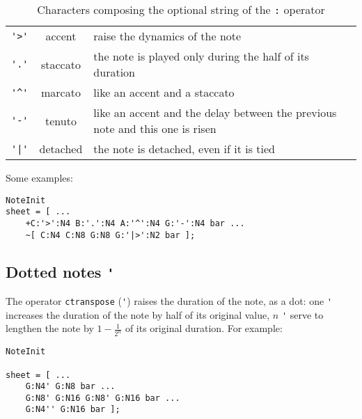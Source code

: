\documentclass{article}
\begin{document}
\begin{table}
	\center
\begin{tabular}{ccp{7cm}}
\lstinline!'>'! & accent & raise the dynamics of the note \\
\lstinline!'.'! & staccato & the note is played only during the half of its duration \\
\lstinline!'^'! & marcato & like an accent and a staccato \\
\lstinline!'-'! & tenuto & like an accent and the delay between the previous note and this one is risen \\
\lstinline!'|'! & detached & the note is detached, even if it is tied
\end{tabular}
\caption{Characters composing the optional string of the \lstinline!:! operator}
\label{table:charsOfColon}
\end{table}

Some examples: \\

\begin{lstlisting}
NoteInit
sheet = [ ...
	+C:'>':N4 B:'.':N4 A:'^':N4 G:'-':N4 bar ...
	~[ C:N4 C:N8 G:N8 G:'|>':N2 bar ];
\end{lstlisting}

\subsection{Dotted notes \lstinline!'!}

The operator \lstinline!ctranspose! (\lstinline!'!) raises the duration of the note, as a dot: one \lstinline!'! increases the duration of the note by half of its original value, $n$ \lstinline!'! serve to lengthen the note by $1 - \frac{1}{2^n}$ of its original duration. For example: \\

\begin{lstlisting}
NoteInit

sheet = [ ...
	G:N4' G:N8 bar ...
	G:N8' G:N16 G:N8' G:N16 bar ...
	G:N4'' G:N16 bar ];
\end{lstlisting}
\end{document}
